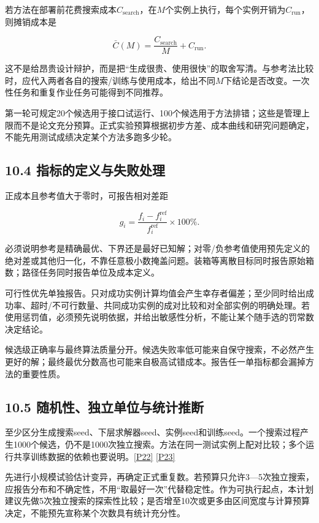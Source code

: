 若方法在部署前花费搜索成本\(C_{\mathrm{search}}\)，在\(M\)个实例上执行，每个实例开销为\(C_{\mathrm{run}}\)，则摊销成本是

\[
\bar C(M)=\frac{C_{\mathrm{search}}}{M}+C_{\mathrm{run}}.
\]

这不是给昂贵设计辩护，而是把``生成很贵、使用很快''的取舍写清。与参考法比较时，应代入两者各自的搜索/训练与使用成本，给出不同\(M\)下结论是否改变。一次性任务和重复作业任务可能得到不同推荐。

第一轮可规定20个候选用于接口试运行、100个候选用于方法排错；这些是管理上限而不是论文充分预算。正式实验预算根据初步方差、成本曲线和研究问题确定，不能先用测试成绩决定某个方法多跑多少轮。

\subsection{10.4
指标的定义与失败处理}\label{ux6307ux6807ux7684ux5b9aux4e49ux4e0eux5931ux8d25ux5904ux7406}

正成本且参考值大于零时，可报告相对差距

\[
g_i=\frac{f_i-f_i^{\mathrm{ref}}}{f_i^{\mathrm{ref}}}\times100\%.
\]

必须说明参考是精确最优、下界还是最好已知解；对零/负参考值使用预先定义的绝对差或其他归一化，不靠任意极小数掩盖问题。装箱等离散目标同时报告原始箱数；路径任务同时报告单位及成本定义。

可行性优先单独报告。只对成功实例计算均值会产生幸存者偏差；至少同时给出成功率、超时/不可行数量、共同成功实例的成对比较和对全部实例的明确处理。若使用惩罚值，必须预先说明依据，并给出敏感性分析，不能让某个随手选的罚常数决定结论。

候选级正确率与最终算法质量分开。候选失败率低可能来自保守搜索，不必然产生更好的解；最终最优分数高也可能来自极高试错成本。报告任一单指标都会漏掉方法的重要性质。

\subsection{10.5
随机性、独立单位与统计推断}\label{ux968fux673aux6027ux72ecux7acbux5355ux4f4dux4e0eux7edfux8ba1ux63a8ux65ad}

至少区分生成搜索seed、下层求解器seed、实例seed和训练seed。一个搜索过程产生1000个候选，仍不是1000次独立搜索。方法在同一测试实例上配对比较；多个运行共享训练数据的依赖也要说明。\href{https://jmlr.org/papers/v22/20-303.html}{{[}P22{]}}
\href{https://jmlr.org/papers/v7/demsar06a.html}{{[}P23{]}}

先进行小规模试验估计变异，再确定正式重复数。若预算只允许3---5次独立搜索，应报告分布和不确定性，不用``取最好一次''代替稳定性。作为可执行起点，本计划建议先做5次独立搜索的探索性比较；是否增至10次或更多由区间宽度与计算预算决定，不能预先宣称某个次数具有统计充分性。

